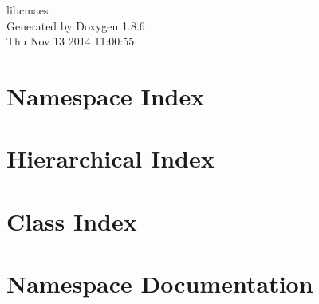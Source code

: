 \documentclass[twoside]{book}
\newcommand{\clearemptydoublepage}{%
  \newpage{\pagestyle{empty}\cleardoublepage}%
}
\begin{document}
\hypersetup{pageanchor=false}
\begin{titlepage}
\vspace*{7cm}
\begin{center}%
{\Large libcmaes }\\
\vspace*{1cm}
{\large Generated by Doxygen 1.8.6}\\
\vspace*{0.5cm}
{\small Thu Nov 13 2014 11:00:55}\\
\end{center}
\end{titlepage}
\clearemptydoublepage
\tableofcontents
\clearemptydoublepage
{}
\hypersetup{pageanchor=true}

\chapter{Namespace Index}

\chapter{Hierarchical Index}

\chapter{Class Index}

\chapter{Namespace Documentation}


\end{document}
